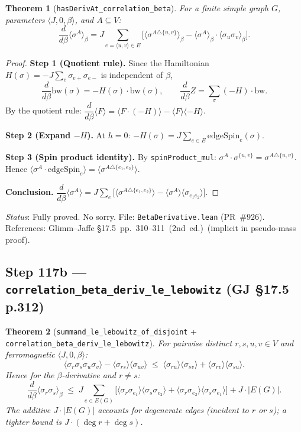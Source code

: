 \documentclass[a4paper,11pt]{article}
\newtheorem{theorem}{Theorem}
\begin{document}
\begin{theorem}[\texttt{hasDerivAt\_correlation\_beta}]
For a finite simple graph $G$, parameters $\langle J, 0, \beta\rangle$, and $A \subseteq V$:
\[
  \frac{d}{d\beta}\langle\sigma^A\rangle_\beta
  = J \sum_{e=\langle u,v\rangle \in E}
    \bigl[\langle\sigma^{A\triangle\{u,v\}}\rangle_\beta
          - \langle\sigma^A\rangle_\beta \cdot \langle\sigma_u\sigma_v\rangle_\beta\bigr].
\]
\end{theorem}

\begin{proof}
\textbf{Step 1 (Quotient rule).}
Since the Hamiltonian $H(\sigma) = -J\sum_e\sigma_{e+}\sigma_{e-}$ is independent of $\beta$,
\[
  \frac{d}{d\beta}\mathrm{bw}(\sigma) = -H(\sigma)\cdot\mathrm{bw}(\sigma), \qquad
  \frac{d}{d\beta}Z = \sum_\sigma(-H)\cdot\mathrm{bw}.
\]
By the quotient rule:
$\dfrac{d}{d\beta}\langle F\rangle = \langle F\cdot(-H)\rangle - \langle F\rangle\langle{-H}\rangle$.

\textbf{Step 2 (Expand $-H$).}
At $h=0$: $-H(\sigma) = J\sum_{e\in E}\mathrm{edgeSpin}_e(\sigma)$.

\textbf{Step 3 (Spin product identity).}
By \texttt{spinProduct\_mul}: $\sigma^A \cdot \sigma^{\{u,v\}} = \sigma^{A\triangle\{u,v\}}$.
Hence $\langle\sigma^A\cdot\mathrm{edgeSpin}_e\rangle = \langle\sigma^{A\triangle\{e_1,e_2\}}\rangle$.

\textbf{Conclusion.}
$\dfrac{d}{d\beta}\langle\sigma^A\rangle = J\sum_e\bigl[\langle\sigma^{A\triangle\{e_1,e_2\}}\rangle - \langle\sigma^A\rangle\langle\sigma_{e_1e_2}\rangle\bigr]$.
\end{proof}

\noindent\textit{Status}: Fully proved. No sorry.
File: \texttt{BetaDerivative.lean} (PR~\#926).
References: Glimm--Jaffe \S17.5~pp.~310--311~(2nd~ed.)~(implicit in pseudo-mass proof).

\subsection*{Step 117b — \texttt{correlation\_beta\_deriv\_le\_lebowitz} (GJ \S17.5 p.312)}

\begin{theorem}[\texttt{summand\_le\_lebowitz\_of\_disjoint} + \texttt{correlation\_beta\_deriv\_le\_lebowitz}]
For pairwise distinct $r,s,u,v \in V$ and ferromagnetic $\langle J,0,\beta\rangle$:
\[
  \langle\sigma_r\sigma_s\sigma_u\sigma_v\rangle
    - \langle\sigma_{rs}\rangle\langle\sigma_{uv}\rangle
  \;\leq\;
  \langle\sigma_{ru}\rangle\langle\sigma_{sv}\rangle
  + \langle\sigma_{rv}\rangle\langle\sigma_{su}\rangle.
\]
Hence for the $\beta$-derivative and $r \neq s$:
\[
  \frac{d}{d\beta}\langle\sigma_r\sigma_s\rangle_{\beta}
  \;\leq\;
  J\sum_{e \in E(G)}
    \bigl[\langle\sigma_r\sigma_{e_1}\rangle\langle\sigma_s\sigma_{e_2}\rangle
        + \langle\sigma_r\sigma_{e_2}\rangle\langle\sigma_s\sigma_{e_1}\rangle\bigr]
  + J\cdot|E(G)|.
\]
The additive $J\cdot|E(G)|$ accounts for degenerate edges (incident to $r$ or $s$);
a tighter bound is $J\cdot(\deg r + \deg s)$.
\end{theorem}
\end{document}
